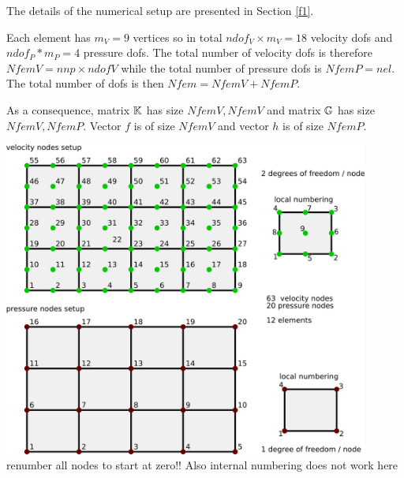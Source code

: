 The details of the numerical setup are presented in Section \ref{f1}.

Each element has $m_V=9$ vertices so in total $ndof_V\times m_V=18$ velocity dofs and 
$ndof_P*m_P=4$ pressure dofs. The total number of 
velocity dofs is therefore $NfemV=nnp \times ndofV$ while the total number of
pressure dofs is $NfemP=nel$. The total number of dofs is then $Nfem=NfemV+NfemP$.

As a consequence, matrix ${\mathbb{K}}$ has size $NfemV,NfemV$ and matrix ${\mathbb{G}}$ has size $NfemV,NfemP$.
Vector $f$ is of size $NfemV$ and vector $h$ is of size $NfemP$.  

\begin{center}
\includegraphics[width=12cm]{python_codes/fieldstone_saddlepoint_q2q1/q2q1setup}\\
{\color{red} renumber all nodes to start at zero!! Also internal numbering does not work here }
\end{center}

